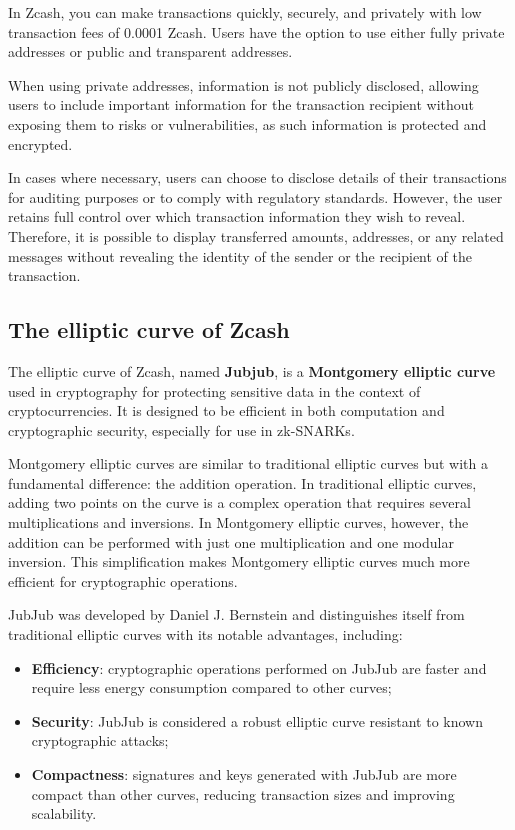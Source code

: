 In Zcash, you can make transactions quickly, securely, and privately with low transaction fees of 0.0001 Zcash. Users have the option to use either fully private addresses or public and transparent addresses.

\noindent When using private addresses, information is not publicly disclosed, allowing users to include important information for the transaction recipient without exposing them to risks or vulnerabilities, as such information is protected and encrypted.

\noindent In cases where necessary, users can choose to disclose details of their transactions for auditing purposes or to comply with regulatory standards. However, the user retains full control over which transaction information they wish to reveal. Therefore, it is possible to display transferred amounts, addresses, or any related messages without revealing the identity of the sender or the recipient of the transaction.

\subsection{The elliptic curve of Zcash}

The elliptic curve of Zcash, named \textbf{Jubjub}, is a \textbf{Montgomery elliptic curve} used in cryptography for protecting sensitive data in the context of cryptocurrencies. It is designed to be efficient in both computation and cryptographic security, especially for use in zk-SNARKs.

\noindent Montgomery elliptic curves are similar to traditional elliptic curves but with a fundamental difference: the addition operation. In traditional elliptic curves, adding two points on the curve is a complex operation that requires several multiplications and inversions. In Montgomery elliptic curves, however, the addition can be performed with just one multiplication and one modular inversion. This simplification makes Montgomery elliptic curves much more efficient for cryptographic operations.

\noindent JubJub was developed by Daniel J. Bernstein and distinguishes itself from traditional elliptic curves with its notable advantages, including:

\begin{itemize}
    \item \textbf{Efficiency}: cryptographic operations performed on JubJub are faster and require less energy consumption compared to other curves;
    \item \textbf{Security}: JubJub is considered a robust elliptic curve resistant to known cryptographic attacks;
    \item \textbf{Compactness}: signatures and keys generated with JubJub are more compact than other curves, reducing transaction sizes and improving scalability.
\end{itemize}

